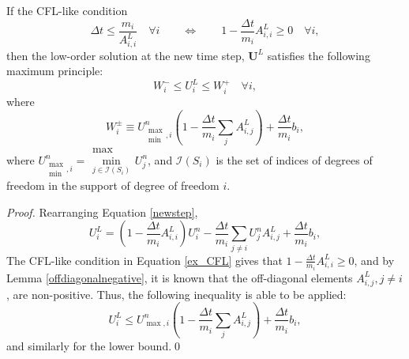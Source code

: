 \begin{theorem}
If the CFL-like condition
\begin{equation}\label{ex_CFL}
   \Delta t \leq \frac{m_i}{A_{i,i}^L}\quad\forall i
   \qquad\Longleftrightarrow\qquad
   1 - \frac{\Delta t}{m_i}A_{i,i}^L \geq 0\quad\forall i,
\end{equation}
then the low-order solution at the new time step, $\mathbf{U}^L$ satisfies the following maximum principle:
\begin{equation}\label{explicit_max_principle}
   W_i^-\leq U_i^L\leq W_i^+\quad\forall i,
\end{equation}
where
\begin{equation}\label{ex_bounds}
   W_i^\pm\equiv U_{\substack{\max\\\min},i}^n\left(1-\frac{\Delta t}{m_i}\sum\limits_j A^L_{i,j}\right)
      + \frac{\Delta t}{m_i}b_i,
\end{equation}
where $U_{\substack{\max\\\min},i}^n = \substack{\max\\\min\limits_{j\in \mathcal{I}(S_i)}}U_j^n$,
and $\mathcal{I}(S_i)$ is the set of indices of degrees of freedom in the
support of degree of freedom $i$.
\end{theorem}
\begin{proof}
Rearranging Equation \ref{newstep},
\[
   U_i^L = \left(1-\frac{\Delta t}{m_i}A^L_{i,i}\right)U_i^n - \frac{\Delta t}{m_i}
      \sum\limits_{j\ne i} U_j^n A^L_{i,j} + \frac{\Delta t}{m_i}b_i,
\]
The CFL-like condition in Equation \ref{ex_CFL} gives that $1-\frac{\Delta t}{m_i}A^L_{i,i} \ge 0$, and by
Lemma \ref{offdiagonalnegative}, it is known that the off-diagonal
elements $A^L_{i,j}, j\ne i$, are non-positive. Thus, the following inequality is
able to be applied:
\[
   U_i^L \le
   U_{\max,i}^n\left(1-\frac{\Delta t}{m_i}\sum\limits_j A^L_{i,j}\right)
      + \frac{\Delta t}{m_i}b_i,
\]
and similarly for the lower bound.\qed
\end{proof}